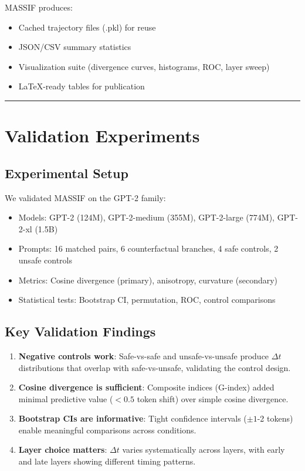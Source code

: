 \documentclass[12pt,a4paper]{article}
\begin{document}
MASSIF produces:
\begin{itemize}
    \item Cached trajectory files (.pkl) for reuse
    \item JSON/CSV summary statistics
    \item Visualization suite (divergence curves, histograms, ROC, layer sweep)
    \item LaTeX-ready tables for publication
\end{itemize}

\medskip
\hrule
\medskip

\section{Validation Experiments}

\subsection{Experimental Setup}

We validated MASSIF on the GPT-2 family:
\begin{itemize}
    \item Models: GPT-2 (124M), GPT-2-medium (355M), GPT-2-large (774M), GPT-2-xl (1.5B)
    \item Prompts: 16 matched pairs, 6 counterfactual branches, 4 safe controls, 2 unsafe controls
    \item Metrics: Cosine divergence (primary), anisotropy, curvature (secondary)
    \item Statistical tests: Bootstrap CI, permutation, ROC, control comparisons
\end{itemize}

\subsection{Key Validation Findings}

\begin{enumerate}
    \item \textbf{Negative controls work}: Safe-vs-safe and unsafe-vs-unsafe produce \(\Delta t\) distributions that overlap with safe-vs-unsafe, validating the control design.
    
    \item \textbf{Cosine divergence is sufficient}: Composite indices (G-index) added minimal predictive value (\(<0.5\) token shift) over simple cosine divergence.
    
    \item \textbf{Bootstrap CIs are informative}: Tight confidence intervals (\(\pm 1\)-2 tokens) enable meaningful comparisons across conditions.
    
    \item \textbf{Layer choice matters}: \(\Delta t\) varies systematically across layers, with early and late layers showing different timing patterns.
\end{enumerate}
\end{document}
